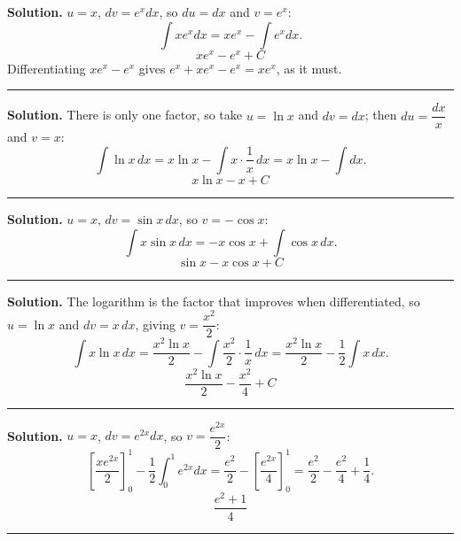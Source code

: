 \documentclass[12pt]{article}
\begin{document}



\textbf{Solution.} $u = x$, $dv = e^x dx$, so $du = dx$ and $v = e^x$:
\[ \int x e^x dx = x e^x - \int e^x dx . \]
\[ \boxed{x e^{x} - e^{x} + C} \]
Differentiating $xe^x - e^x$ gives $e^x + xe^x - e^x = xe^x$, as it must.

\vspace{0.15cm}\noindent\rule{\linewidth}{0.2pt}


\textbf{Solution.} There is only one factor, so take $u = \ln x$ and
$dv = dx$; then $du = \dfrac{dx}{x}$ and $v = x$:
\[ \int \ln x\,dx = x\ln x - \int x\cdot\frac{1}{x}\,dx = x\ln x - \int dx . \]
\[ \boxed{x\ln x - x + C} \]

\vspace{0.15cm}\noindent\rule{\linewidth}{0.2pt}


\textbf{Solution.} $u = x$, $dv = \sin x\,dx$, so $v = -\cos x$:
\[ \int x\sin x\,dx = -x\cos x + \int \cos x\,dx . \]
\[ \boxed{\sin x - x\cos x + C} \]

\vspace{0.15cm}\noindent\rule{\linewidth}{0.2pt}


\textbf{Solution.} The logarithm is the factor that improves when
differentiated, so $u = \ln x$ and $dv = x\,dx$, giving
$v = \dfrac{x^2}{2}$:
\[ \int x\ln x\,dx = \frac{x^2\ln x}{2} - \int \frac{x^2}{2}\cdot\frac{1}{x}\,dx
   = \frac{x^2\ln x}{2} - \frac{1}{2}\int x\,dx . \]
\[ \boxed{\frac{x^2\ln x}{2} - \frac{x^2}{4} + C} \]

\vspace{0.15cm}\noindent\rule{\linewidth}{0.2pt}


\textbf{Solution.} $u = x$, $dv = e^{2x}dx$, so $v = \dfrac{e^{2x}}{2}$:
\[ \left[\frac{x e^{2x}}{2}\right]_0^1 - \frac{1}{2}\int_0^1 e^{2x}dx
   = \frac{e^{2}}{2} - \left[\frac{e^{2x}}{4}\right]_0^1
   = \frac{e^{2}}{2} - \frac{e^{2}}{4} + \frac{1}{4}. \]
\[ \boxed{\frac{e^{2} + 1}{4}} \]

\vspace{0.15cm}\noindent\rule{\linewidth}{0.2pt}

\end{document}
